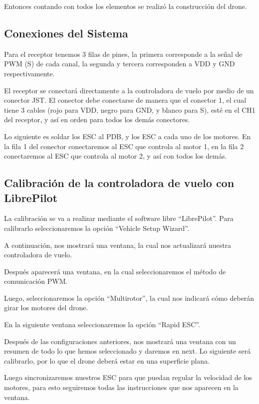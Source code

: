 \documentclass[pdflatex,sn-mathphys-num]{sn-jnl}%
\begin{document}
Entonces contando con todos los elementos se realizó la construcción del drone.

\subsection{Conexiones del Sistema}

Para el receptor tenemos 3 filas de pines, la primera corresponde a la señal de PWM (S) de cada canal, la segunda y tercera corresponden a VDD y GND respectivamente.

El receptor se conectará directamente a la controladora de vuelo por medio de un conector JST. El conector debe conectarse de manera que el conector 1, el cual tiene 3 cables (rojo para VDD, negro para GND, y blanco para S), esté en el CH1 del receptor, y así en orden para todos los demás conectores.

Lo siguiente es soldar los ESC al PDB, y los ESC a cada uno de los motores. En la fila 1 del conector conectaremos al ESC que controla al motor 1, en la fila 2 conectaremos al ESC que controla al motor 2, y así con todos los demás.

\subsection{Calibración de la controladora de vuelo con LibrePilot}

La calibración se va a realizar mediante el software libre ``LibrePilot''. Para calibrarlo seleccionaremos la opción ``Vehicle Setup Wizard''.

A continuación, nos mostrará una ventana, la cual nos actualizará nuestra controladora de vuelo.

Después aparecerá una ventana, en la cual seleccionaremos el método de comunicación PWM.

Luego, seleccionaremos la opción ``Multirotor'', la cual nos indicará cómo deberán girar los motores del drone.

En la siguiente ventana seleccionaremos la opción ``Rapid ESC''.

Después de las configuraciones anteriores, nos mostrará una ventana con un resumen de todo lo que hemos seleccionado y daremos en next. Lo siguiente será calibrarlo, por lo que el drone deberá estar en una superficie plana.

Luego sincronizaremos nuestros ESC para que puedan regular la velocidad de los motores, para esto seguiremos todas las instrucciones que nos aparecen en la ventana.
\end{document}
